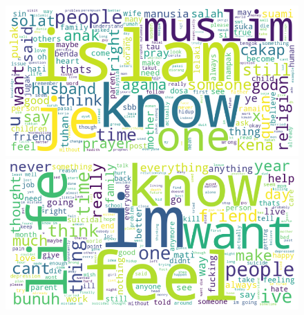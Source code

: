 \documentclass[preprint]{article}
\begin{document}
\begin{figure}[h]
  \centering
  \begin{minipage}[b]{0.45\textwidth}
    \centering
    \includegraphics[width=\linewidth]{img/religion-wordcloud.png}
  \end{minipage}
  \hfill
  \begin{minipage}[b]{0.45\textwidth}
    \centering
    \includegraphics[width=\linewidth]{img/selfharm-worcloud.png}
  \end{minipage}
\end{figure}
\end{document}
